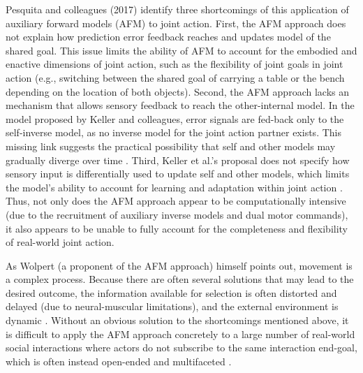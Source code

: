\begin{CJK}{UTF8}{gbsn}
Pesquita and colleagues (2017) identify three shortcomings of this application of auxiliary forward models (AFM) to joint action.  First, the AFM approach does not explain how prediction error feedback reaches and updates model of the shared goal.  This issue limits the ability of AFM to account for the embodied and enactive dimensions of joint action, such as the flexibility of joint goals in joint action (e.g., switching between the shared goal of carrying a table or the bench depending on the location of both objects).  Second, the AFM approach lacks an mechanism that allows sensory feedback to reach the other-internal model. In the model proposed by Keller and colleagues, error signals are fed-back only to the self-inverse model, as no inverse model for the joint action partner exists. This missing link suggests the practical possibility that self and other models may gradually diverge over time \citep{Pickering2014}.  Third, Keller et al.’s proposal does not specify how sensory input is differentially used to update self and other models, which limits the model's ability to account for learning and adaptation within joint action \citep{Pesquita2017}.  Thus, not only does the AFM approach appear to be computationally intensive (due to the recruitment of auxiliary inverse models and dual motor commands), it also appears to be unable to fully account for the completeness and flexibility of real-world joint action.

As Wolpert (a proponent of the AFM approach) himself points out, movement is a complex process. Because there are often several solutions that may lead to the desired outcome, the information available for selection is often distorted and delayed (due to neural-muscular limitations), and the external environment is dynamic \citep{Wolpert1997}. Without an obvious solution to the shortcomings mentioned above, it is difficult to apply the AFM approach concretely to a large number of real-world social interactions where actors do not subscribe to the same interaction end-goal, which is often instead open-ended and multifaceted \citep{Pesquita2017}.


\end{CJK}
